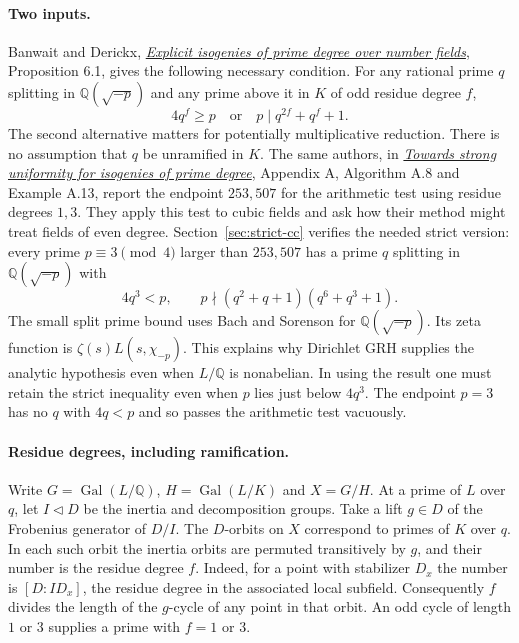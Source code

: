 \paragraph{Two inputs.}
Banwait and Derickx, \href{https://doi.org/10.2140/ant.2025.19.1147}
{\emph{Explicit isogenies of prime degree over number fields}},
Proposition 6.1, gives the following necessary condition. For any
rational prime $q$ splitting in $\mathbb Q(\sqrt{-p})$ and any prime
above it in $K$ of odd residue degree $f$,
\begin{equation}
 4q^f\ge p \quad\text{or}\quad p\mid q^{2f}+q^f+1.
 \tag{CC}\label{eq:cc}
\end{equation}
The second alternative matters for potentially multiplicative reduction.
There is no assumption that $q$ be unramified in $K$.
The same authors, in \href{https://arxiv.org/pdf/2302.08350}
{\emph{Towards strong uniformity for isogenies of prime degree}},
Appendix A, Algorithm A.8 and Example A.13, report the endpoint
$253{,}507$ for the arithmetic test using residue degrees $1,3$. They
apply this test to cubic fields and ask how their method might treat
fields of even degree. Section~\ref{sec:strict-cc} verifies the needed
strict version: every prime $p\equiv3\pmod4$ larger than $253{,}507$
has a prime $q$ splitting in $\mathbb Q(\sqrt{-p})$ with
\[
 4q^3<p,\qquad p\nmid(q^2+q+1)(q^6+q^3+1).
\]
The small split prime bound uses Bach and Sorenson for
$\mathbb Q(\sqrt{-p})$. Its zeta function is
$\zeta(s)L(s,\chi_{-p})$. This explains why Dirichlet GRH
supplies the analytic hypothesis even when $L/\mathbb Q$ is nonabelian.
In using the result one must retain the strict inequality even when
$p$ lies just below $4q^3$. The endpoint $p=3$ has no $q$ with $4q<p$
and so passes the arithmetic test vacuously.

\paragraph{Residue degrees, including ramification.}
Write $G=\operatorname{Gal}(L/\mathbb Q)$, $H=\operatorname{Gal}(L/K)$
and $X=G/H$. At a prime of $L$ over $q$, let $I\triangleleft D$ be the
inertia and decomposition groups. Take a lift $g\in D$ of the Frobenius
generator of $D/I$. The $D$-orbits on $X$ correspond to primes of $K$
over $q$. In each such orbit the inertia orbits are permuted transitively
by $g$, and their number is the residue degree $f$.
Indeed, for a point with stabilizer $D_x$ the number is $[D:I D_x]$,
the residue degree in the associated local subfield. Consequently $f$
divides the length of the $g$-cycle of any point in that orbit.
An odd cycle of length $1$ or $3$ supplies a prime with $f=1$ or $3$.

